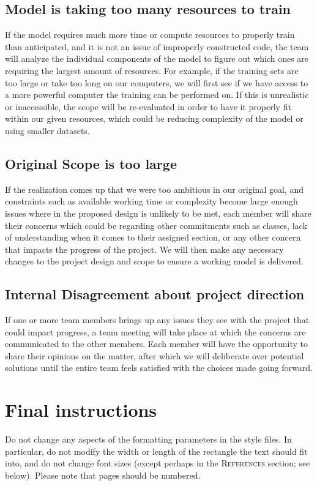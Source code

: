 \documentclass{article} %
\begin{document}
\subsection{Model is taking too many resources to train}

If the model requires much more time or compute resources to properly train than anticipated, and it is not an issue of improperly constructed code, the team will analyze the individual components of the model to figure out which ones are requiring the largest amount of resources. For example, if the training sets are too large or take too long on our computers, we will first see if we have access to a more powerful computer the training can be performed on. If this is unrealistic or inaccessible, the scope will be re-evaluated in order to have it properly fit within our given resources, which could be reducing complexity of the model or using smaller datasets.

\subsection{Original Scope is too large}

If the realization comes up that we were too ambitious in our original goal, and constraints such as available working time or complexity become large enough issues where in the proposed design is unlikely to be met, each member will share their concerns which could be regarding other commitments such as classes, lack of understanding when it comes to their assigned section, or any other concern that impacts the progress of the project. We will then make any necessary changes to the project design and scope to ensure a working model is delivered.

\subsection{Internal Disagreement about project direction}

If one or more team members brings up any issues they see with the project that could impact progress, a team meeting will take place at which the concerns are communicated to the other members. Each member will have the opportunity to share their opinions on the matter, after which we will deliberate over potential solutions until the entire team feels satisfied with the choices made going forward.


\section{Final instructions}
Do not change any aspects of the formatting parameters in the style files.
In particular, do not modify the width or length of the rectangle the text
should fit into, and do not change font sizes (except perhaps in the
\textsc{References} section; see below). Please note that pages should be
numbered.
\end{document}
